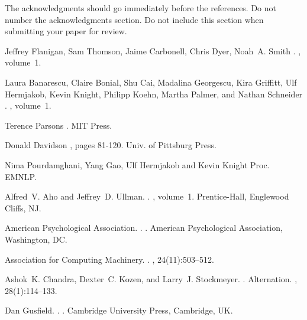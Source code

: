 \documentclass[11pt]{article}
\begin{document}
The acknowledgments should go immediately before the references.  Do
not number the acknowledgments section. Do not include this section
when submitting your paper for review.

%
%

\begin{thebibliography}{}

Jeffrey Flanigan, Sam Thomson, Jaime Carbonell, Chris Dyer, Noah~A. Smith
.
, volume~1.

Laura Banarescu, Claire Bonial, Shu Cai, Madalina Georgescu, Kira Griffitt, Ulf Hermjakob, Kevin Knight, Philipp Koehn, Martha Palmer, and Nathan Schneider
.
, volume~1.

Terence Parsons
.
\newblock MIT Press.

Donald Davidson
, pages 81-120.
\newblock Univ. of Pittsburg Press.

Nima Pourdamghani, Yang Gao, Ulf Hermjakob and Kevin Knight
\newblock Proc. EMNLP.

Alfred~V. Aho and Jeffrey~D. Ullman.
.
, volume~1.
\newblock Prentice-{Hall}, Englewood Cliffs, NJ.

{American Psychological Association}.
.
.
\newblock American Psychological Association, Washington, DC.

{Association for Computing Machinery}.
.
, 24(11):503--512.

Ashok~K. Chandra, Dexter~C. Kozen, and Larry~J. Stockmeyer.
.
\newblock Alternation.
,
  28(1):114--133.

Dan Gusfield.
.
.
\newblock Cambridge University Press, Cambridge, UK.

\end{thebibliography}
\end{document}

